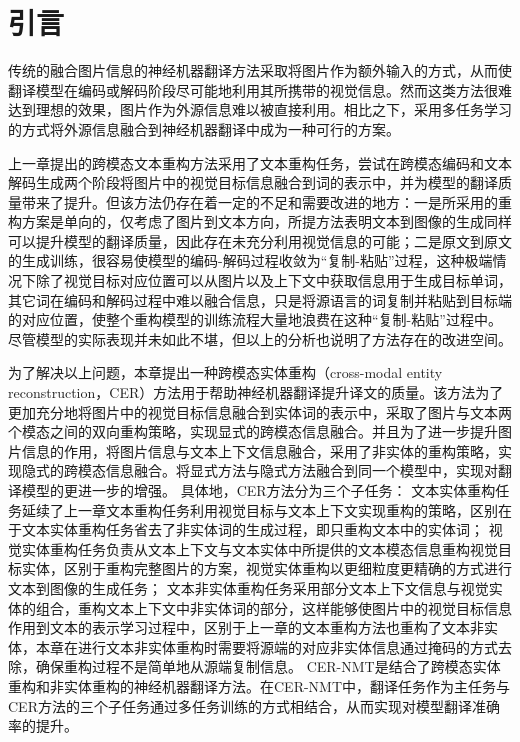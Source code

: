 \section{引言}
传统的融合图片信息的神经机器翻译方法采取将图片作为额外输入的方式，从而使翻译模型在编码或解码阶段尽可能地利用其所携带的视觉信息。然而这类方法很难达到理想的效果，图片作为外源信息难以被直接利用。相比之下，采用多任务学习的方式将外源信息融合到神经机器翻译中成为一种可行的方案。


上一章提出的跨模态文本重构方法采用了文本重构任务，尝试在跨模态编码和文本解码生成两个阶段将图片中的视觉目标信息融合到词的表示中，并为模型的翻译质量带来了提升。但该方法仍存在着一定的不足和需要改进的地方：一是所采用的重构方案是单向的，仅考虑了图片到文本方向，所提方法表明文本到图像的生成同样可以提升模型的翻译质量，因此存在未充分利用视觉信息的可能；二是原文到原文的生成训练，很容易使模型的编码-解码过程收敛为“复制-粘贴”过程，这种极端情况下除了视觉目标对应位置可以从图片以及上下文中获取信息用于生成目标单词，其它词在编码和解码过程中难以融合信息，只是将源语言的词复制并粘贴到目标端的对应位置，使整个重构模型的训练流程大量地浪费在这种“复制-粘贴”过程中。
尽管模型的实际表现并未如此不堪，但以上的分析也说明了方法存在的改进空间。

为了解决以上问题，本章提出一种跨模态实体重构（cross-modal entity reconstruction，CER）方法用于帮助神经机器翻译提升译文的质量。该方法为了更加充分地将图片中的视觉目标信息融合到实体词的表示中，采取了图片与文本两个模态之间的双向重构策略，实现显式的跨模态信息融合。并且为了进一步提升图片信息的作用，将图片信息与文本上下文信息融合，采用了非实体的重构策略，实现隐式的跨模态信息融合。将显式方法与隐式方法融合到同一个模型中，实现对翻译模型的更进一步的增强。
具体地，CER方法分为三个子任务：
文本实体重构任务延续了上一章文本重构任务利用视觉目标与文本上下文实现重构的策略，区别在于文本实体重构任务省去了非实体词的生成过程，即只重构文本中的实体词；
视觉实体重构任务负责从文本上下文与文本实体中所提供的文本模态信息重构视觉目标实体，区别于重构完整图片的方案，视觉实体重构以更细粒度更精确的方式进行文本到图像的生成任务；
文本非实体重构任务采用部分文本上下文信息与视觉实体的组合，重构文本上下文中非实体词的部分，这样能够使图片中的视觉目标信息作用到文本的表示学习过程中，区别于上一章的文本重构方法也重构了文本非实体，本章在进行文本非实体重构时需要将源端的对应非实体信息通过掩码的方式去除，确保重构过程不是简单地从源端复制信息。
CER-NMT是结合了跨模态实体重构和非实体重构的神经机器翻译方法。在CER-NMT中，翻译任务作为主任务与CER方法的三个子任务通过多任务训练的方式相结合，从而实现对模型翻译准确率的提升。

